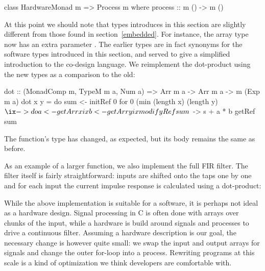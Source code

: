 \documentclass[../paper.tex]{subfiles}
\begin{document}
\begin{code}
class HardwareMonad m => Process m where
  process :: m () -> m ()
\end{code}

At this point we should note that types introduces in this section are slightly different from those found in section~\ref{embedded}. For instance, the array type now has an extra parameter . The earlier types are in fact synonyms for the software types introduced in this section, and served to give a simplified introduction to the co-design language. We reimplement the dot-product using the new types as a comparison to the old:

\begin{code}
dot :: (MonadComp m, TypeM m a, Num a) => Arr m a -> Arr m a -> m (Exp m a)
dot x y = do
  sum <- initRef 0
  for 0 (min (length x) (length y) $ \ix -> do
    a <- getArr x ix
    b <- getArr y ix
    modifyRef sum $ \s -> s + a * b
  getRef sum
\end{code}

\noindent The function's type has changed, as expected, but its body remains the same as before.

As an example of a larger function, we also implement the full FIR filter. The filter itself is fairly straightforward: inputs are shifted onto the taps one by one and for each input the current impulse response is calculated using a dot-product:


While the above implementation is suitable for a software, it is perhaps not ideal as a hardware design. Signal processing in C is often done with arrays over chunks of the input, while a hardware is build around signals and processes to drive a continuous filter. Assuming a hardware description is our goal, the necessary change is however quite small: we swap the input and output arrays for signals and change the outer for-loop into a process. Rewriting programs at this scale is a kind of optimization we think developers are comfortable with.
\end{document}
